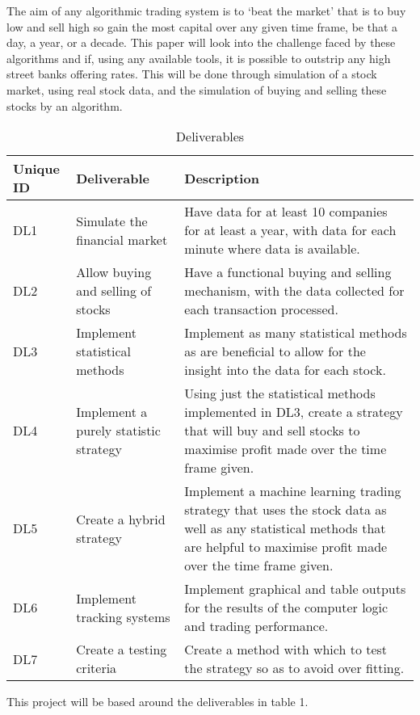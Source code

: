 \documentclass[conference]{IEEEtran}
\begin{document}
The aim of any algorithmic trading system is to `beat the market' that is to buy low and sell high so gain the most capital over any given time frame, be that a day, a year, or a decade. This paper will look into the challenge faced by these algorithms and if, using any available tools, it is possible to outstrip any high street banks offering rates. This will be done through simulation of a stock market, using real stock data, and the simulation of buying and selling these stocks by an algorithm.

\setlength\extrarowheight{2pt}

\begin{table*}
\centering
\label{units}
\begin{tabu}{ |l|l|p{10cm}| }\hline\hline
Unique ID & Deliverable & Description \\ \hline
DL1 & Simulate the financial market & Have data for at least 10 companies for at least a year, with data for each minute where data is available. \\ \hline
DL2 & Allow buying and selling of stocks & Have a functional buying and selling mechanism, with the data collected for each transaction processed. \\ \hline
DL3 & Implement statistical methods & Implement as many statistical methods as are beneficial to allow for the insight into the data for each stock. \\ \hline
DL4 & Implement a purely statistic strategy & Using just the statistical methods implemented in DL3, create a strategy that will buy and sell stocks to maximise profit made over the time frame given. \\ \hline
DL5 & Create a hybrid strategy & Implement a machine learning trading strategy that uses the stock data as well as any statistical methods that are helpful to maximise profit made over the time frame given. \\ \hline
DL6 & Implement tracking systems & Implement graphical and table outputs for the results of the computer logic and trading performance. \\ \hline
DL7 & Create a testing criteria & Create a method with which to test the strategy so as to avoid over fitting. \\ \hline
\end{tabu}
\vspace{2 mm}
\caption{Deliverables}
\end{table*}

This project will be based around the deliverables in table 1.
\end{document}
